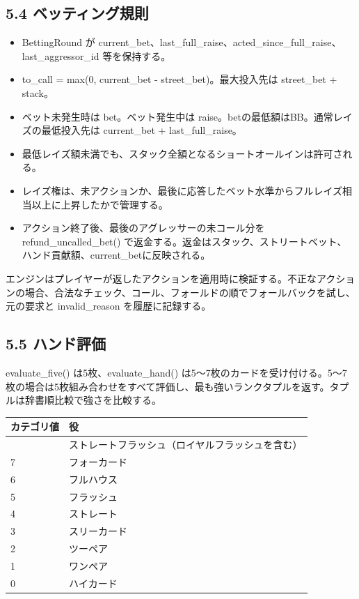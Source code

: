 \documentclass[
]{article}
\begin{document}
\subsection{5.4
ベッティング規則}\label{ux30d9ux30c3ux30c6ux30a3ux30f3ux30b0ux898fux5247}

\begin{itemize}
\item
  BettingRound が
  current\_bet、last\_full\_raise、acted\_since\_full\_raise、last\_aggressor\_id
  等を保持する。
\item
  to\_call = max(0, current\_bet - street\_bet)。最大投入先は
  street\_bet + stack。
\item
  ベット未発生時は bet。ベット発生中は
  raise。betの最低額はBB。通常レイズの最低投入先は current\_bet +
  last\_full\_raise。
\item
  最低レイズ額未満でも、スタック全額となるショートオールインは許可される。
\item
  レイズ権は、未アクションか、最後に応答したベット水準からフルレイズ相当以上に上昇したかで管理する。
\item
  アクション終了後、最後のアグレッサーの未コール分を
  refund\_uncalled\_bet()
  で返金する。返金はスタック、ストリートベット、ハンド貢献額、current\_betに反映される。
\end{itemize}

エンジンはプレイヤーが返したアクションを適用時に検証する。不正なアクションの場合、合法なチェック、コール、フォールドの順でフォールバックを試し、元の要求と
invalid\_reason を履歴に記録する。

\subsection{5.5 ハンド評価}\label{ux30cfux30f3ux30c9ux8a55ux4fa1}

evaluate\_five() は5枚、evaluate\_hand()
は5～7枚のカードを受け付ける。5～7枚の場合は5枚組み合わせをすべて評価し、最も強いランクタプルを返す。タプルは辞書順比較で強さを比較する。

\begin{longtable}[]{@{}ll@{}}
\toprule\noalign{}
カテゴリ値 & 役 \\
\midrule\noalign{}
\endhead
\bottomrule\noalign{}
\endlastfoot
8 & ストレートフラッシュ（ロイヤルフラッシュを含む） \\
7 & フォーカード \\
6 & フルハウス \\
5 & フラッシュ \\
4 & ストレート \\
3 & スリーカード \\
2 & ツーペア \\
1 & ワンペア \\
0 & ハイカード \\
\end{longtable}
\end{document}
